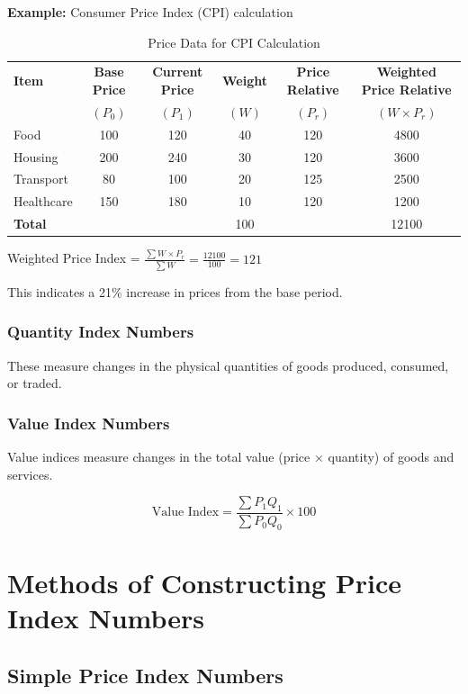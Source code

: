 \documentclass[twoside]{book}
\begin{document}
\textbf{Example:} Consumer Price Index (CPI) calculation

\begin{table}[h]
\centering
\caption{Price Data for CPI Calculation}
\begin{tabular}{lccccc}
\toprule
\textbf{Item} & \textbf{Base Price} & \textbf{Current Price} & \textbf{Weight} & \textbf{Price Relative} & \textbf{Weighted Price Relative} \\
 & $(P_0)$ & $(P_1)$ & $(W)$ & $(P_r)$ & $(W \times P_r)$ \\
\midrule
Food & 100 & 120 & 40 & 120 & 4800 \\
Housing & 200 & 240 & 30 & 120 & 3600 \\
Transport & 80 & 100 & 20 & 125 & 2500 \\
Healthcare & 150 & 180 & 10 & 120 & 1200 \\
\midrule
\textbf{Total} & & & 100 & & 12100 \\
\bottomrule
\end{tabular}
\end{table}

Weighted Price Index = $\frac{\sum W \times P_r}{\sum W} = \frac{12100}{100} = 121$

This indicates a 21\% increase in prices from the base period.

\subsubsection{Quantity Index Numbers}
These measure changes in the physical quantities of goods produced, consumed, or traded.

\subsubsection{Value Index Numbers}
Value indices measure changes in the total value (price × quantity) of goods and services.

\begin{equation}
    \text{Value Index} = \frac{\sum P_1 Q_1}{\sum P_0 Q_0} \times 100
\end{equation}

\section{Methods of Constructing Price Index Numbers}

\subsection{Simple Price Index Numbers}
\end{document}
